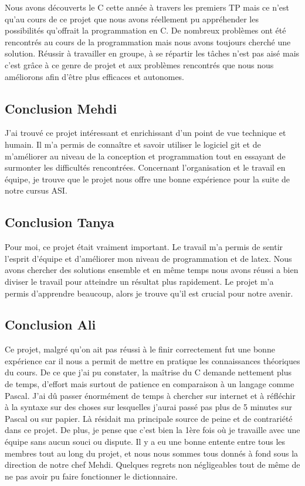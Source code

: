 
	Nous avons découverts le C cette année à travers les premiers TP mais ce n'est qu'au cours de ce projet que nous
	avons réellement pu appréhender les possibilités qu'offrait la programmation en C.
	De nombreux problèmes ont été rencontrés au cours de la programmation mais nous avons toujours cherché une solution. Réussir à travailler en groupe, à se répartir les tâches n'est pas aisé mais c'est grâce à ce
	genre de projet et aux problèmes rencontrés que nous nous améliorons afin
	d'être plus efficaces et autonomes.
	\subsection{Conclusion Mehdi}
	J'ai trouvé ce projet intéressant et enrichissant d'un point de vue technique et  humain. Il m'a permis de connaître et savoir utiliser le logiciel git et de m'améliorer au niveau de la conception et programmation tout en essayant de surmonter les difficultés rencontrées.
	Concernant l'organisation et le travail en équipe, je trouve que le projet nous offre une bonne
	expérience pour la suite de notre cursus ASI. 
	\subsection{Conclusion Tanya}
	Pour moi, ce projet était vraiment important. Le travail m'a permis de sentir l'esprit d'équipe et d'améliorer mon niveau de programmation et de latex. Nous avons chercher des solutions ensemble et en même temps nous avons réussi a bien diviser le travail pour atteindre un résultat plus rapidement. Le projet m'a permis d'apprendre beaucoup, alors je trouve qu'il est crucial pour notre avenir. 
	\subsection{Conclusion Ali}
	Ce projet, malgré qu'on ait pas réussi à le finir correctement fut une bonne expérience car il nous a permit de mettre en pratique les connaissances théoriques du cours. De ce que j'ai pu constater, la maîtrise du C demande nettement plus de temps, d'effort mais surtout de patience en comparaison à un langage comme Pascal. J'ai dû passer énormément de temps à chercher sur internet et à réfléchir à la syntaxe sur des choses sur lesquelles j'aurai passé pas plus de 5 minutes sur Pascal ou sur papier. Là résidait ma principale source de peine et de contrariété dans ce projet. De plus, je pense que c'est bien la 1ère fois où je travaille avec une équipe sans aucun souci ou dispute. Il y a eu une bonne entente entre tous les membres tout au long du projet, et nous nous sommes tous donnés à fond sous la direction de notre chef Mehdi. Quelques regrets non négligeables tout de même de ne pas avoir pu faire fonctionner le dictionnaire.
